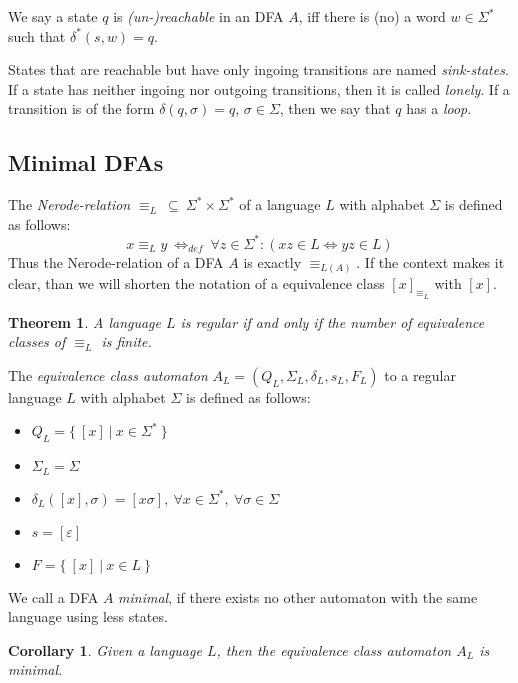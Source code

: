 \documentclass[a4paper, oneside, 11pt]{report}
\newtheorem{theorem}{Theorem}
\newtheorem{corollary}{Corollary}
\theoremstyle{definition}
\theoremstyle{remark}
\begin{document}
We say a state $q$ is \emph{(un-)reachable} in an DFA $A$, iff there is (no) a word $w \in \Sigma^*$ such that $\delta^*(s, w) = q$.

States that are reachable but have only ingoing transitions are named \emph{sink-states}.
If a state has neither ingoing nor outgoing transitions, then it is called \emph{lonely}.
If a transition is of the form $\delta(q, \sigma) = q$, $\sigma\in\Sigma$, then we say that $q$ has a \emph{loop}.

\subsection{Minimal DFAs}

The \emph{Nerode-relation} $\equiv_L\ \subseteq\ \Sigma^* \times \Sigma^*$ of a language $L$ with alphabet $\Sigma$ is defined as follows:
\begin{displaymath}
	x \equiv_L y\ \Leftrightarrow_{def}\ \forall z\in\Sigma^*\colon (xz\in L \Leftrightarrow yz\in L)
\end{displaymath}
Thus the Nerode-relation of a DFA $A$ is exactly $\equiv_{L(A)}$. If the context makes it clear, than we will shorten the notation of a equivalence class $[x]_{\equiv_L}$ with $[x]$.

\begin{theorem}
	A language $L$ is regular if and only if the number of equivalence classes of $\equiv_L$ is finite.
\end{theorem}

The \emph{equivalence class automaton} $A_L = (Q_L, \Sigma_L, \delta_L, s_L, F_L)$ to a regular language $L$ with alphabet $\Sigma$ is defined as follows:
\begin{itemize}
	\item $Q_L = \{\ [x]\ |\ x \in \Sigma^*\ \}$
	\item $\Sigma_L = \Sigma$
	\item $\delta_L([x], \sigma) = [x\sigma],\ \forall x\in\Sigma^*,\ \forall\sigma\in\Sigma$
	\item $s = [\varepsilon]$
	\item $F = \{\ [x]\ |\ x \in L\ \}$
\end{itemize}
We call a DFA $A$ \emph{minimal}, if there exists no other automaton with the same language using less states.
\begin{corollary}
	Given a language $L$, then the equivalence class automaton $A_L$ is minimal.
\end{corollary}
\end{document}
